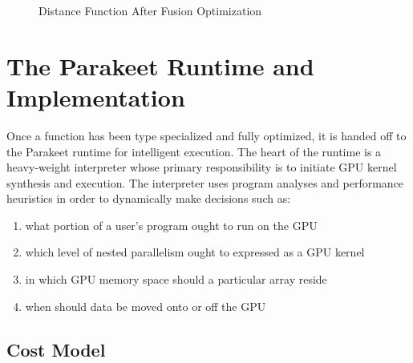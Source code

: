 \documentclass[preprint]{sigplanconf}
\begin{document}
\begin{figure}[h!]

\caption{Distance Function After Fusion Optimization}
\label{DistFuse}
\end{figure}

\section{The Parakeet Runtime and Implementation}
\label{runtime}

Once a function has been type specialized and fully optimized, it is handed off to the Parakeet runtime for intelligent execution. The heart of the runtime is a heavy-weight interpreter whose primary responsibility is to initiate GPU kernel synthesis and execution. The interpreter uses program analyses and performance heuristics in order to dynamically make decisions such as: 
\begin{enumerate}
\item what portion of a user's program ought to run on the GPU 
\item which level of nested parallelism ought to expressed as a GPU kernel
\item in which GPU memory space should a particular array reside 
\item when should data be moved onto or off the GPU
\end{enumerate} 

\subsection{Cost Model}
\label{costmodel}
\end{document}
